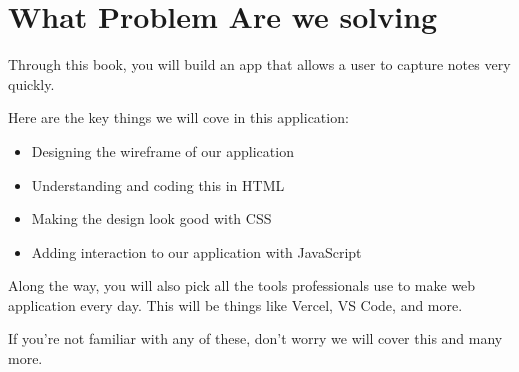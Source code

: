\documentclass[11pt]{article}
\begin{document}
    \section{What Problem Are we solving}\label{sec:what-problem-are-we-solving}
    Through this book, you will build an app that allows a user to capture notes very quickly.

    Here are the key things we will cove in this application:
    \begin{itemize}
        \item Designing the wireframe of our application
        \item Understanding and coding this in HTML
        \item Making the design look good with CSS
        \item Adding interaction to our application with JavaScript
    \end{itemize}

    Along the way, you will also pick all the tools professionals use to make web application every day. This will be things like Vercel, VS Code, and more.

    If you're not familiar with any of these, don't worry we will cover this and many more.
\end{document}
